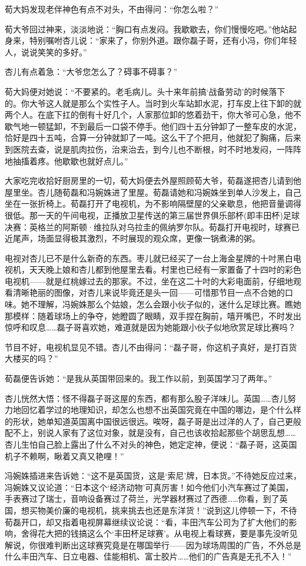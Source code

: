 \par 荀大妈发现老伴神色有点不对头，不由得问：“你怎么啦？”
\par 荀大爷回过神来，淡淡地说：“胸口有点发闷。我歇歇去，你们慢慢吃吧。”他站起身来，特别嘱咐杏儿说：“家来了，你别外道。跟你磊子哥，还有小冯，你们年轻人，说说笑笑的多好。”
\par 杏儿有点着急：“大爷您怎么了？碍事不碍事？”
\par 荀大妈便对她说：“不要紧的。老毛病儿。头十来年前搞‘战备劳动’的时候落下的。你大爷这人就是那么个实性子人。当时到火车站卸水泥，打车皮上往下卸的就两个人。在底下扛的倒有十好几个，人家那位卸的悠着劲干，你大爷可心急，他不歇气地一顿猛卸，不到最后一口袋不停手。他们四十五分钟卸了一整车皮的水泥，恰好是四十五吨，合算一分钟就卸了一吨。这么干了个把月，他就犯了胸痛，后来到医院去查，说是肌肉拉伤，治来治去，到今儿也不断根，时不时地发闷，一阵阵地抽搐着疼。他歇歇也就好点儿。”
\par 大家吃完收拾好厨房里的一切，荀大妈便去外屋照顾荀大爷，荀磊遂把杏儿请到他屋里坐。杏儿随荀磊和冯婉姝进了里屋。荀磊请她和冯婉姝坐到单人沙发上，自己坐在一张折椅上。荀磊打开了电视机，为不影响隔壁屋的父亲歇息，他把音量调得很低。那一天的午间电视，正播放卫星传送的第三届世界俱乐部杯(即丰田杯)足球决赛：英格兰的阿斯顿·维拉队对乌拉圭的佩纳罗尔队。荀磊打开电视时，球赛已近尾声，场面显得极其激烈，不时展现的观众席，更像一锅煮沸的粥。
\par 电视对杏儿已不是什么新奇的东西。枣儿就已经买了一台上海金星牌的十吋黑白电视机，天天晚上娘和杏儿都到他屋里去看。村里也已经有一家置备了十四吋的彩色电视机——就是红桃嫁过去的那家。不过，坐在这二十吋的大彩电面前，仔细地观看清晰艳丽的图像，对杏儿来说毕竟还是头一回——可惜那节目一点不合她的口味。她不理解，冯婉姝那么个姑娘，怎么会跟小伙子似的，迷什么足球比赛。瞧她那模样：随着球场上的争夺，她瞪圆了眼睛，双手捏在胸前，嘻开嘴巴，不时发出惊呼和叹息……磊子哥喜欢她，难道就是因为她能跟小伙子似地欣赏足球比赛吗？
\par 节目不好，电视机显见不错。杏儿不由得问：“磊子哥，你这机子真好，是打百货大楼买的吗？”
\par 荀磊便告诉她：“是我从英国带回来的。我工作以前，到英国学习了两年。”
\par 杏儿恍然大悟：怪不得磊子哥这屋的东西，都有那么股子洋味儿。英国……杏儿努力地回忆着学过的地理知识，却怎么也想不出英国究竟在中国的哪边，是个什么样的形状，她单知道英国离中国很远很远。唉呀，磊子哥是出过洋的人了，自己更般配不上，别说人家有了这位对象，就是没有，自己也该收拾起那些个胡思乱想……杏儿生怕自己脸上露出了什么不对头的神色，她定定神，便说：“磊子哥，这英国机子不赖啊，瞅着又真又艳哩！”
\par 冯婉姝插进来告诉她：“这不是英国货，这是‘索尼’牌，日本货。”不待她反应过来，冯婉姝又议论道：“日本这个‘经济动物’可真厉害！如今他们小汽车赛过了美国，手表赛过了瑞士，音响设备赛过了荷兰，光学器材赛过了西德……你看，到了英国，想买物美价廉的电视机，挑来挑去也还是东洋货！”说到这儿停顿一下，不待荀磊开口，却又指着电视屏幕继续议论说：“看，丰田汽车公司为了扩大他们的影响，舍得花大把的钱搞这么个‘丰田杯足球赛’。从电视上看球赛，要是事先没听见解说，你很难判断出这球赛究竟是在哪国举行——因为球场周围的广告，不外总是什么丰田汽车、日立电器、佳能相机、富士胶片……他们的广告真是无孔不入！”
